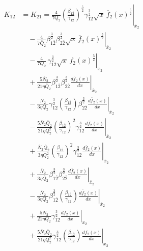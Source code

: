 \documentclass[final,3p,times,twocolumn]{elsarticle}
\begin{document}
\begin{equation}
\begin{split}
K_{12} &= K_{21} =
\left.\frac{4}{7 Q_2}
\left(\frac{\beta_{1\overline{2}}}{\gamma_{12}}\right)^{\frac{5}{2}}
\gamma_{12}^{\frac{3}{2}} \sqrt{x}\,\overline{f}_{2}(x)^{\frac{5}{2}}
\right|_{\overline{x}_{2}} \\
&\quad
- \left.
\frac{4}{7 \overline{Q}_{2}}
\beta_{1\overline{2}}^{\frac{3}{2}}
\beta_{2\overline{2}}^{\frac{3}{2}}
\sqrt{x}\,\overline{f}_{2}(x)^{\frac{5}{2}}
\right|_{\overline{x}_{2}} \\
&\quad
- \left.
\frac{4}{7 Q_2}\,
\gamma_{12}^{\frac{3}{2}}
\sqrt{x}\,f_2(x)^{\frac{5}{2}}
\right|_{x_2} \\
&\quad
+ \left.
\frac{5 \overline{N}_{2}}{21 \eta \overline{Q}_{2}}
\beta_{1\overline{2}}^{\frac{3}{2}}
\beta_{2\overline{2}}^{\frac{3}{2}}
\frac{d\overline{f}_{2}(x)}{dx}
\right|_{\overline{x}_{2}} \\
&\quad
- \left.
\frac{\overline{N}_{2}}{3 \eta Q_2}
\gamma_{12}^{\frac{3}{2}}
\left(\frac{\beta_{1\overline{2}}}{\gamma_{12}}\right)
\beta_{2\overline{2}}^{\frac{3}{2}}
\frac{d\overline{f}_{2}(x)}{dx}
\right|_{\overline{x}_{2}} \\
&\quad
- \left.
\frac{5 \overline{N}_{2} \overline{Q}_{2}}{21 \eta Q_2^{2}}
\left(\frac{\beta_{1\overline{2}}}{\gamma_{12}}\right)^{2}
\gamma_{12}^{\frac{3}{2}}
\frac{d\overline{f}_{2}(x)}{dx}
\right|_{\overline{x}_{2}} \\
&\quad
+ \left.
\frac{\overline{N}_{2} \overline{Q}_{2}}{3 \eta Q_2^{2}}
\left(\frac{\beta_{1\overline{2}}}{\gamma_{12}}\right)^{2}
\gamma_{12}^{\frac{3}{2}}
\frac{d\overline{f}_{2}(x)}{dx}
\right|_{\overline{x}_{2}} \\
&\quad
+ \left.
\frac{\overline{N}_{2}}{3 \eta \overline{Q}_{2}}
\beta_{1\overline{2}}^{\frac{3}{2}}
\beta_{2\overline{2}}^{\frac{3}{2}}
\frac{d\overline{f}_{2}(x)}{dx}
\right|_{\overline{x}_{2}} \\
&\quad
- \left.
\frac{\overline{N}_{2}}{3 \eta Q_2}
\beta_{1\overline{2}}^{\frac{3}{2}}
\left(\frac{\beta_{1\overline{2}}}{\gamma_{12}}\right)
\frac{d\overline{f}_{2}(x)}{dx}
\right|_{\overline{x}_{2}} \\
&\quad
+ \left.
\frac{5 N_2}{21 \eta Q_2}
\gamma_{12}^{\frac{3}{2}}
\frac{d f_2(x)}{dx}
\right|_{x_2} \\
&\quad
+ \left.
\frac{5 \overline{N}_{2} \overline{Q}_{2}}{21 \eta Q_2^{2}}
\gamma_{12}^{\frac{3}{2}}
\left(\frac{\beta_{1\overline{2}}}{\gamma_{12}}\right)
\frac{d f_2(x)}{dx}
\right|_{x_2} \\

\end{split}
\end{equation}
\end{document}
